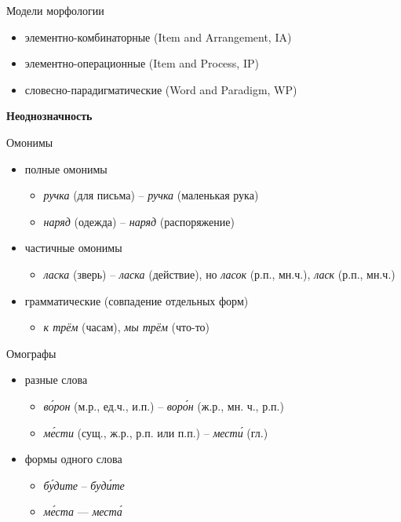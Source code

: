 \documentclass{beamer}
\begin{document}
\begin{frame}{Модели морфологии}
\begin{itemize}
\item элементно-комбинаторные (Item and Arrangement, IA)
\item элементно-операционные (Item and Process, IP)
\item словесно-парадигматические (Word and Paradigm, WP)
\end{itemize}
\end{frame}





\begin{frame}{}
\begin{center}
	\textbf{Неоднозначность}
\end{center}
\end{frame}

\begin{frame}{Омонимы}
\begin{itemize}
\item полные омонимы
\begin{itemize}
\item \textit{ручка} (для письма) -- \textit{ручка} (маленькая рука)
\item \textit{наряд} (одежда) -- \textit{наряд} (распоряжение)
\end{itemize}
\item частичные омонимы
\begin{itemize}
\item \textit{ласка} (зверь) -- \textit{ласка} (действие), но \textit{ласок} (р.п., мн.ч.), \textit{ласк} (р.п., мн.ч.)
\end{itemize}
\item грамматические (совпадение отдельных форм)
\begin{itemize}
\item \textit{к трём} (часам), \textit{мы трём} (что-то)
\end{itemize}
\end{itemize}
\end{frame}

\begin{frame}{Омографы}
\begin{itemize}
\item разные слова
\begin{itemize}
\item \textit{в\'{о}рон} (м.р., ед.ч., и.п.) -- \textit{вор\'{о}н} (ж.р., мн. ч., р.п.)
\item \textit{м\'{е}сти} (сущ., ж.р., р.п. или п.п.) -- \textit{мест\'{и}} (гл.)
\end{itemize}
\item формы одного слова
\begin{itemize}
\item \textit{б\'{у}дите} -- \textit{буд\'{и}те}
\item \textit{м\'{е}ста} — \textit{мест\'{а}}
\end{itemize}
\end{itemize}
\end{frame}
\end{document}
